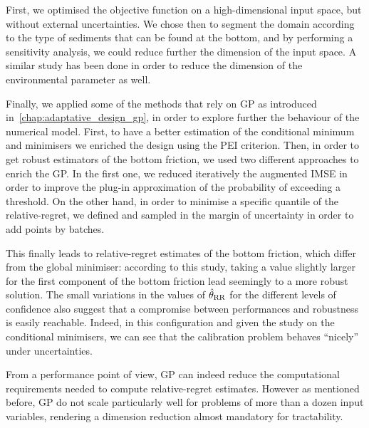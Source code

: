 \documentclass[../../Main_ManuscritThese.tex]{subfiles}
\begin{document}
First, we optimised the objective function on a high-dimensional input
space, but without external uncertainties. We chose then to segment
the domain according to the type of sediments that can be found at the
bottom, and by performing a sensitivity analysis, we could reduce
further the dimension of the input space.
A similar study has been done in order to reduce the dimension of the
environmental parameter as well.

Finally, we applied some of the methods that rely on GP as introduced
in~\cref{chap:adaptative_design_gp}, in order to explore further the
behaviour of the numerical model. First, to have a better estimation
of the conditional minimum and minimisers we enriched the design using
the PEI criterion. Then, in order to get robust estimators of the
bottom friction, we used two different approaches to enrich the GP. In
the first one, we reduced iteratively the augmented IMSE in order to
improve the plug-in approximation of the probability of exceeding a
threshold. On the other hand, in order to minimise a specific quantile
of the relative-regret, we defined and sampled in the margin of
uncertainty in order to add points by batches.

This finally leads to relative-regret estimates of the bottom
friction, which differ from the global minimiser: according to this
study, taking a value slightly larger for the first component of the
bottom friction lead seemingly to a more robust solution. The small
variations in the values of $\hat{\theta}_{\mathrm{RR}}$ for the
different levels of confidence also suggest that a compromise between
performances and robustness is easily reachable. Indeed, in this
configuration and given the study on the conditional minimisers, we
can see that the calibration problem behaves ``nicely'' under
uncertainties.





From a performance point of view, GP can indeed reduce the
computational requirements needed to compute relative-regret
estimates. However as mentioned before, GP do not scale particularly
well for problems of more than a dozen input variables, rendering a
dimension reduction almost mandatory for tractability.
\end{document}
